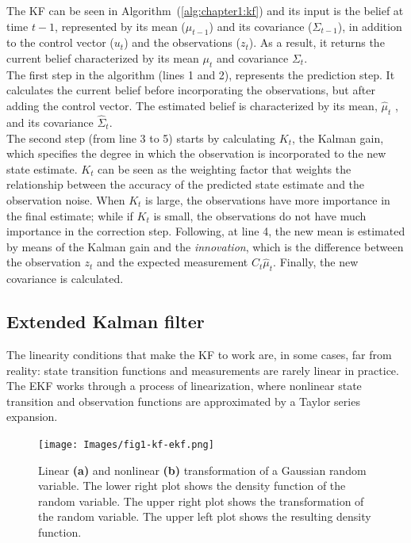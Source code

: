The \ac{KF} can be seen in Algorithm~(\ref{alg:chapter1:kf}) and its input is the belief at time $t-1$, represented by its mean ($\mu_{t-1}$) and its covariance ($\Sigma_{t-1}$), in addition to the control vector ($u_t$) and the observations ($z_t$). As a result, it returns the current belief characterized by its mean $\mu_t$ and covariance $\Sigma_t$. \\

The first step in the algorithm (lines 1 and 2), represents the prediction step. It calculates the current belief before incorporating the observations, but after adding the control vector. The estimated belief is characterized by its mean, $\hat\mu_t$ , and its covariance $\hat\Sigma_t$.\\

The second step (from line 3 to 5) starts by calculating $K_t$, the Kalman gain, which specifies the degree in which the observation is incorporated to the new state estimate. $K_t$ can be seen as the weighting factor that weights the relationship between the accuracy of the predicted state estimate and the observation noise. When $K_t$ is large, the observations have more importance in the final estimate; while if $K_t$ is small, the observations do not have much importance in the correction step. Following, at line 4, the new mean is estimated by means of the Kalman gain and the \emph{innovation}, which is the difference between the observation $z_t$ and the expected measurement $C_t \hat\mu_t$. Finally, the new covariance is calculated.

\subsection{Extended Kalman filter}
\label{subsec:chapter1:kf:ekf}

The linearity conditions that make the \ac{KF} to work are, in some cases, far from reality: state transition functions and measurements are rarely linear in practice. The \ac{EKF} works through a process of linearization, where nonlinear state transition and observation functions are approximated by a Taylor series expansion. \\

\begin{figure}
    \centering
    \texttt{[image: Images/fig1-kf-ekf.png]}
    \caption[Linear and nonlinear transformation of a Gaussian random variable]{Linear \textbf{(a)} and nonlinear \textbf{(b)} transformation of a Gaussian random variable. The lower right plot shows the density function of the random variable. The upper right plot shows the transformation of the random variable. The upper left plot shows the resulting density function. \cite{prob-robotics}}
    \label{fig:chapter1:kf:ekf:cmp-kf-ekf}
\end{figure}

